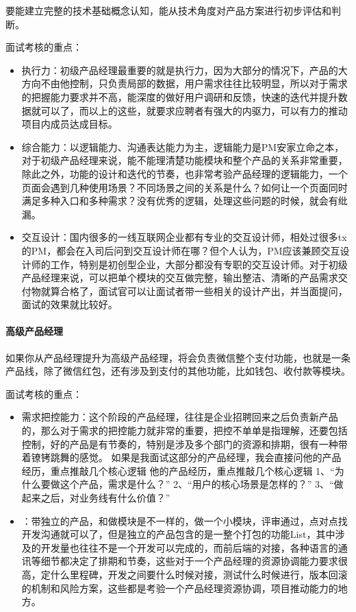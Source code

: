 \documentclass[letterpaper,11pt,english]{sphinxmanual}
\begin{document}
要能建立完整的技术基础概念认知，能从技术角度对产品方案进行初步评估和判断。

面试考核的重点：
\begin{itemize}
\item {} 
执行力：初级产品经理最重要的就是执行力，因为大部分的情况下，产品的大方向不由他控制，只负责局部的数据，用户需求往往比较明显，所以对于需求的把握能力要求并不高，能深度的做好用户调研和反馈，快速的迭代并提升数据就可以了，而以上的这些，就要求应聘者有强大的内驱力，可以有力的推动项目内成员达成目标。

\item {} 
综合能力：以逻辑能力、沟通表达能力为主，逻辑能力是PM安家立命之本，对于初级产品经理来说，能不能理清楚功能模块和整个产品的关系非常重要，除此之外，功能的设计和迭代的节奏，也非常考验产品经理的逻辑能力，一个页面会遇到几种使用场景？不同场景之间的关系是什么？如何让一个页面同时满足多种入口和多种需求？没有优秀的逻辑，处理这些问题的时候，就会有纰漏。

\item {} 
交互设计：国内很多的一线互联网企业都有专业的交互设计师，相处过很多tx的PM，都会在入司后问到交互设计师在哪？但个人认为，PM应该兼顾交互设计师的工作，特别是初创型企业，大部分都没有专职的交互设计师。对于初级产品经理来说，可以把单个模块的交互做完整，输出整洁、清晰的产品需求交付物就算合格了，面试官可以让面试者带一些相关的设计产出，并当面提问，面试的效果就比较好。

\end{itemize}


\paragraph{高级产品经理}
\label{\detokenize{chapter_experience/career_path:id5}}
如果你从产品经理提升为高级产品经理，将会负责微信整个支付功能，也就是一条产品线，除了微信红包，还有涉及到支付的其他功能，比如钱包、收付款等模块。

面试考核的重点：
\begin{itemize}
\item {} 
需求把控能力：这个阶段的产品经理，往往是企业招聘回来之后负责新产品的，那么对于需求的把控能力就非常的重要，把控不单单是指理解，还要包括控制，好的产品是有节奏的，特别是涉及多个部门的资源和排期，很有一种带着镣铐跳舞的感觉。
如果是我面试这部分的产品经理，我会直接问他的产品经历，重点推敲几个核心逻辑
他的产品经历，重点推敲几个核心逻辑
1、“为什么要做这个产品，需求是什么？” 2、“用户的核心场景是怎样的？”
3、“做起来之后，对业务线有什么价值？”

\item {} 
：带独立的产品，和做模块是不一样的，做一个小模块，评审通过，点对点找开发沟通就可以了，但是独立的产品包含的是一整个打包的功能List，其中涉及的开发量也往往不是一个开发可以完成的，而前后端的对接，各种语言的通讯等细节都决定了排期和节奏，这些对于一个产品经理的资源协调能力要求很高，定什么里程碑，开发之间要什么时候对接，测试什么时候进行，版本回滚的机制和风险方案，这些都是考验一个产品经理资源协调，项目推动能力的地方。

\end{itemize}
\end{document}
